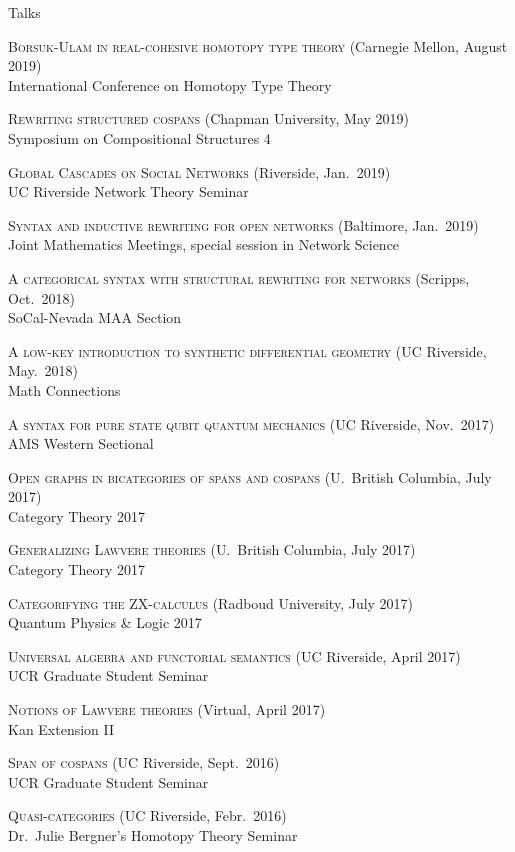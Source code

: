 \documentclass{Resume} %
\begin{document}

\begin{rSection}{Talks}

  \textsc{Borsuk-Ulam in real-cohesive homotopy type theory} \hfill
  (Carnegie Mellon, August 2019) \\
  International Conference on Homotopy Type Theory
  
  \textsc{Rewriting structured cospans} \hfill
  (Chapman University, May 2019) \\
  Symposium on Compositional Structures 4

   \textsc{Global Cascades on Social Networks} \hfill
  (Riverside, Jan.~2019) \\
  UC Riverside Network Theory Seminar
  
    \textsc{Syntax and inductive rewriting for open networks} \hfill
  (Baltimore, Jan.~2019) \\
  Joint Mathematics Meetings, special session in Network Science

  \textsc{A categorical syntax with structural rewriting for networks} \hfill
  (Scripps, Oct.~2018) \\
  SoCal-Nevada MAA Section
  
  \textsc{A low-key introduction to synthetic differential geometry} \hfill
  (UC Riverside, May.~2018) \\
  Math Connections
  
  \textsc{A  syntax for pure state qubit quantum mechanics} \hfill (UC Riverside, Nov.~2017) \\
  AMS Western Sectional

  \textsc{Open graphs in bicategories of spans and cospans} \hfill
  (U.~British Columbia, July 2017) \\
  Category Theory 2017
	
  \textsc{Generalizing Lawvere theories} \hfill
  (U.~British Columbia, July 2017) \\
  Category Theory 2017
	
  \textsc{Categorifying the ZX-calculus} \hfill
  (Radboud University, July 2017) \\
  Quantum Physics \& Logic 2017

  \textsc{Universal algebra and functorial semantics} \hfill
  (UC Riverside, April 2017) \\
  UCR Graduate Student Seminar
	
  \textsc{Notions of Lawvere theories} \hfill
  (Virtual, April 2017) \\
  Kan Extension II
	
  \textsc{Span of cospans} \hfill
  (UC Riverside, Sept.~2016) \\
  UCR Graduate Student Seminar

  \textsc{Quasi-categories} \hfill
  (UC Riverside, Febr.~2016) \\
  Dr.\ Julie Bergner's Homotopy Theory Seminar
\end{rSection}
\end{document}
